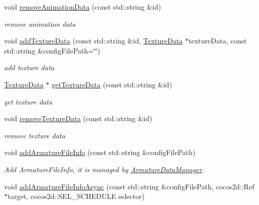 \begin{DoxyCompactItemize}
void \hyperlink{classcocostudio_1_1ArmatureDataManager_a7355fd9a994fe9a51bc7b0ce35cb9008}{remove\+Animation\+Data} (const std\+::string \&id)
\begin{DoxyCompactList}\small\item\em remove animation data \end{DoxyCompactList}\item 
void \hyperlink{classcocostudio_1_1ArmatureDataManager_aed885f4d9ab821f83f3a3826655e3325}{add\+Texture\+Data} (const std\+::string \&id, \hyperlink{classcocostudio_1_1TextureData}{Texture\+Data} $\ast$texture\+Data, const std\+::string \&config\+File\+Path=\char`\"{}\char`\"{})
\begin{DoxyCompactList}\small\item\em add texture data \end{DoxyCompactList}\item 
\hyperlink{classcocostudio_1_1TextureData}{Texture\+Data} $\ast$ \hyperlink{classcocostudio_1_1ArmatureDataManager_a8d464fbdee16e338481824a7e3725d11}{get\+Texture\+Data} (const std\+::string \&id)
\begin{DoxyCompactList}\small\item\em get texture data \end{DoxyCompactList}\item 
void \hyperlink{classcocostudio_1_1ArmatureDataManager_a53b3ec6a3d2264b4321be60b0cdeefc1}{remove\+Texture\+Data} (const std\+::string \&id)
\begin{DoxyCompactList}\small\item\em remove texture data \end{DoxyCompactList}\item 
\mbox{\label{classcocostudio_1_1ArmatureDataManager_a364290e4e2ae9420b51ca4076394e16c}} 
void \hyperlink{classcocostudio_1_1ArmatureDataManager_a364290e4e2ae9420b51ca4076394e16c}{add\+Armature\+File\+Info} (const std\+::string \&config\+File\+Path)
\begin{DoxyCompactList}\small\item\em Add Armature\+File\+Info, it is managed by \hyperlink{classcocostudio_1_1ArmatureDataManager}{Armature\+Data\+Manager}. \end{DoxyCompactList}\item 
\mbox{\label{classcocostudio_1_1ArmatureDataManager_ad7322691cd5f9944744ad6a474374710}} 
void \hyperlink{classcocostudio_1_1ArmatureDataManager_ad7322691cd5f9944744ad6a474374710}{add\+Armature\+File\+Info\+Async} (const std\+::string \&config\+File\+Path, cocos2d\+::\+Ref $\ast$target, cocos2d\+::\+S\+E\+L\+\_\+\+S\+C\+H\+E\+D\+U\+LE selector)

\end{DoxyCompactItemize}
